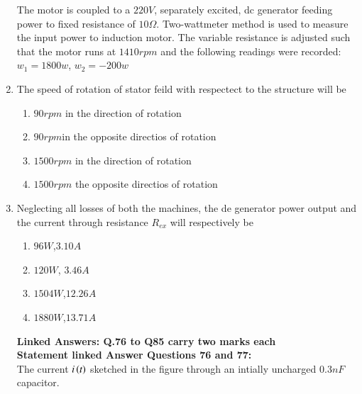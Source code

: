 \documentclass[journal]{IEEEtran}
\begin{document}
\begin{enumerate}
\begin{figure}[!ht]
\label{fig:my_label}
\end{figure}

The motor is coupled to a $220 V$, separately excited, dc generator feeding power to fixed resistance of $10\Omega$. Two-wattmeter method is used to measure the input power to induction motor. The variable resistance is adjusted such that the motor runs at $1410 rpm$ and the following readings were recorded:\\
$w_1=1800w$, $w_2=-200w$\\
\item The speed of rotation of stator feild with respectect to the structure will be 
\begin{enumerate}
    \item $90 rpm$ in the direction of rotation 
    \item $90 rpm$in the opposite directios of rotation 
    \item $1500 rpm$ in the direction of rotation 
    \item $1500 rpm$ the opposite directios of rotation 
\end{enumerate}
\item Neglecting all losses of both the machines, the de generator power output and the current through resistance $R_{ex}$ will respectively be
\begin{enumerate}
    \item $96 W$,$3.10 A$
    \item $120 W$, $3.46 A$
    \item $1504W$,$12.26 A$
    \item $1880W$,$13.71 A$
\end{enumerate}
\textbf{Linked Answers: Q.76 to Q85 carry two marks each}\\
\textbf{Statement linked Answer Questions 76 and 77:}\\
The current $i\left(t\right)$ sketched in the figure through an intially uncharged $0.3 nF$ capacitor.
\begin{figure}[!ht]
\centering
{}
\end{figure}
\end{enumerate}
\end{document}
